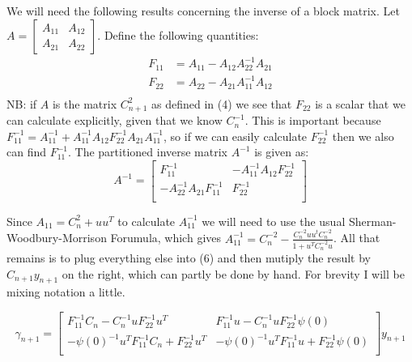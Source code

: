 \documentclass[12pt,a4paper]{article}
\begin{document}
We will need the following results concerning the inverse of a block matrix.  Let $A = \left[ \begin{array}{cc} A_{11} & A_{12} \\ A_{21} & A_{22} \end{array} \right]$.  Define the following quantities:
\begin{equation}
\begin{split}
F_{11} &= A_{11} - A_{12} A_{22}^{-1} A_{21}\\
F_{22} &= A_{22} - A_{21} A_{11}^{-1} A_{12}\\
\end{split}
\end{equation}
NB: if $A$ is the matrix $C_{n+1}^2$ as defined in (4) we see that $F_22$ is a scalar that we can calculate explicitly, given that we know $C_n^{-1}$.  This is important because $F_{11}^{-1} = A_{11}^{-1} + A_{11}^{-1} A_{12} F_{22}^{-1} A_{21} A_{11}^{-1}$, so if we can easily calculate $F_{22}^{-1}$ then we also can find $F_{11}^{-1}$.  The partitioned inverse matrix $A^{-1}$ is given as:
\begin{equation}
A^{-1} = \left[
\begin{array}{cc}
F_{11}^{-1} & -A_{11}^{-1} A_{12} F_{22}^{-1}\\
-A_{22}^{-1} A_{21} F_{11}^{-1} & F_{22}^{-1}\\
\end{array}
\right]
\end{equation}

Since $A_{11} = C_n^2 + uu^T$ to calculate $A_{11}^{-1}$ we will need to use the usual Sherman-Woodbury-Morrison Forumula, which gives $A_{11}^{-1} = C_n^{-2} - \frac{C_n^{-2} uu^t C_n^{-2}}{1 + u^T C_n^{-2}u}$.  All that remains is to plug everything else into (6) and then mutiply the result by $C_{n+1} y_{n+1}$ on the right, which can partly be done by hand.  For brevity I will be mixing notation a little.

\begin{equation}
\gamma_{n+1}  = \left[
\begin{array}{cc}
F_{11}^{-1} C_n - C_n^{-1} u F_{22}^{-1} u^T & F_{11}^{-1} u - C_n^{-1} u F_{22}^{-1} \psi(0)\\
-\psi(0)^{-1} u^T F_{11}^{-1} C_n + F_{22}^{-1}u^T & -\psi(0)^{-1} u^T F_{11}^{-1} u + F_{22}^{-1} \psi(0)\\
\end{array}
\right] y_{n+1}
\end{equation}
\end{document}
